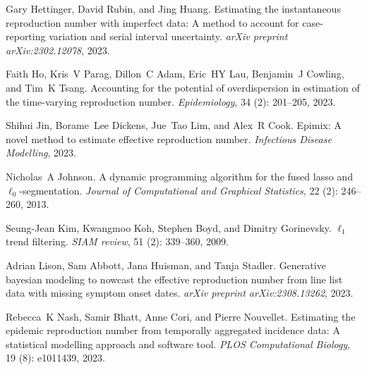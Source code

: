 \documentclass[10pt,letterpaper]{article}
\begin{document}
\begin{thebibliography}{32}
  Gary Hettinger, David Rubin, and Jing Huang.
  \newblock Estimating the instantaneous reproduction number with imperfect data:
    A method to account for case-reporting variation and serial interval
    uncertainty.
  \newblock \emph{arXiv preprint arXiv:2302.12078}, 2023.
  
  Faith Ho, Kris~V Parag, Dillon~C Adam, Eric~HY Lau, Benjamin~J Cowling, and
    Tim~K Tsang.
  \newblock Accounting for the potential of overdispersion in estimation of the
    time-varying reproduction number.
  \newblock \emph{Epidemiology}, 34 (2): 201--205, 2023.
  
  Shihui Jin, Borame~Lee Dickens, Jue~Tao Lim, and Alex~R Cook.
  \newblock Epimix: A novel method to estimate effective reproduction number.
  \newblock \emph{Infectious Disease Modelling}, 2023.
  
  Nicholas~A Johnson.
  \newblock A dynamic programming algorithm for the fused lasso and
    $\ell_0$-segmentation.
  \newblock \emph{Journal of Computational and Graphical Statistics}, 22
    (2): 246--260, 2013.
  
  Seung-Jean Kim, Kwangmoo Koh, Stephen Boyd, and Dimitry Gorinevsky.
  \newblock $\ell_1$ trend filtering.
  \newblock \emph{SIAM review}, 51 (2): 339--360, 2009.
  
  Adrian Lison, Sam Abbott, Jana Huisman, and Tanja Stadler.
  \newblock Generative bayesian modeling to nowcast the effective reproduction
    number from line list data with missing symptom onset dates.
  \newblock \emph{arXiv preprint arXiv:2308.13262}, 2023.
  
  Rebecca~K Nash, Samir Bhatt, Anne Cori, and Pierre Nouvellet.
  \newblock Estimating the epidemic reproduction number from temporally
    aggregated incidence data: A statistical modelling approach and software
    tool.
  \newblock \emph{PLOS Computational Biology}, 19 (8):
    e1011439, 2023.
  

\end{thebibliography}
\end{document}
